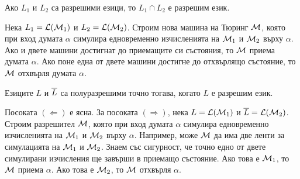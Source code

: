 \begin{proposition}
  Ако $L_1$ и $L_2$ са разрешими езици, то $L_1 \cap L_2$ е разрешим език.
\end{proposition}
\begin{hint}
  Нека $L_1 = \mathcal{L}(\mathcal{M}_1)$ и $L_2 = \mathcal{L}(\mathcal{M}_2)$.
  Строим нова машина на Тюринг $\mathcal{M}$, която при вход думата $\alpha$
  симулира едновременно изчисленията на $\mathcal{M}_1$ и $\mathcal{M}_2$ върху $\alpha$.
  Ако и двете машини достигнат до приемащите си състояния, то $\mathcal{M}$ приема думата $\alpha$.
  Ако поне една от двете машини достигне до отхвърлящо състояние, то $\mathcal{M}$ отхвърля думата $\alpha$.
\end{hint}




\begin{important}
  \begin{theorem}
    \label{th:turing:kleene-post}
    Езиците $L$ и $\overline{L}$ са полуразрешими точно тогава, когато $L$ е разрешим език.
  \end{theorem}
\end{important}
\begin{hint}
  Посоката $(\Leftarrow)$ е ясна.
  За посоката $(\Rightarrow)$, нека $L = \mathcal{L}(\mathcal{M}_1)$ и $\overline{L} = \mathcal{L}(\mathcal{M}_2)$.
  Строим разрешител $\mathcal{M}$, която при вход думата $\alpha$ симулира едновременно изчисленията на $\mathcal{M}_1$ и $\mathcal{M}_2$ върху $\alpha$.
  Например, може $\mathcal{M}$ да има две ленти за симулацията на $\mathcal{M}_1$ и $\mathcal{M}_2$.
  Знаем със сигурност, че точно едно от двете симулирани изчисления ще завърши в приемащо състояние.
  Ако това е $\mathcal{M}_1$, то $\mathcal{M}$ приема $\alpha$.
  Ако това е $\mathcal{M}_2$, то $\mathcal{M}$ отхвърля $\alpha$.
\end{hint}


